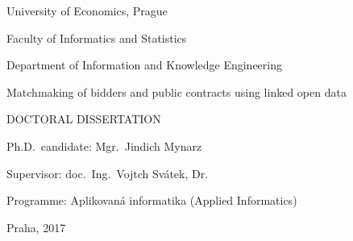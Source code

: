 \begin{titlepage}
    \begin{center}
        \begingroup 
        \sffamily

        \large
        University of Economics, Prague
        
        \small
        Faculty of Informatics and Statistics
        
        Department of Information and Knowledge Engineering

        \vfill

        \LARGE
        Matchmaking of bidders and public contracts using linked open data
        
        \normalsize
        \uppercase{Doctoral dissertation}

        \vspace{4cm}
       
        \small
        Ph.D.~candidate: Mgr.~Jind\rhacek{}ich Mynarz

        Supervisor: doc.~Ing.~Vojt\ehacek{}ch Svátek, Dr.

        Programme: Aplikovaná informatika (Applied Informatics)

        \vfill
        
        Praha, 2017

        \endgroup
    \end{center}
\end{titlepage}
